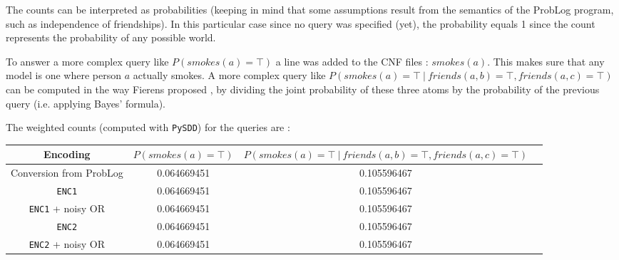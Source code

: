 \begin{multicols*}{2}
\noindent The counts can be interpreted as probabilities (keeping in mind that some assumptions result from the semantics of the ProbLog program, such as independence of friendships). In this particular case since no query was specified (yet), the probability equals 1 since the count represents the probability of any possible world.\\

\par\noindent To answer a more complex query like $P(smokes(a)=\top)$ a line was added to the CNF files : $smokes(a)$.  This makes sure that any model is one where person $a$ actually smokes. A more complex query like $P(smokes(a)=\top\ |\ friends(a,b)=\top,friends(a,c)=\top)$ can be computed in the way Fierens proposed \cite{fierens}, by dividing the joint probability of these three atoms by the probability of the previous query (i.e. applying Bayes' formula).

\end{multicols*}

\par\noindent The weighted counts (computed with \texttt{PySDD}) for the queries are :
\begin{center}
\begin{tabular}{cc|cc}
Encoding & $P(smokes(a)=\top)$ & $P(smokes(a)=\top\ |\ friends(a,b)=\top,friends(a,c)=\top)$ \\\hline
Conversion from ProbLog & 0.064669451 & 0.105596467\\
\texttt{ENC1} & 0.064669451 & 0.105596467\\
\texttt{ENC1} + noisy OR & 0.064669451 & 0.105596467\\
\texttt{ENC2} & 0.064669451 & 0.105596467\\
\texttt{ENC2} + noisy OR & 0.064669451 & 0.105596467\\
\end{tabular}
\end{center}

